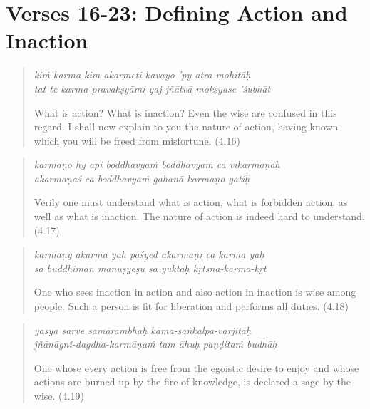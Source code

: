 \documentclass[12pt, twoside, openright]{memoir}
\begin{document}
\section{Verses 16-23: Defining Action and Inaction}\label{sec-verses-16-23-defining-action-and-inaction}

\par
\begin{verse}
\textit{kiṁ karma kim akarmeti kavayo ’py atra mohitāḥ} \\
\textit{tat te karma pravakṣyāmi yaj jñātvā mokṣyase ’śubhāt}

\noindent What is action? What is inaction? Even the wise are confused in this regard. I shall now explain to you the nature of action, having known which you will be freed from misfortune. (4.16)
\end{verse}
\par



\par
\begin{verse}
\textit{karmaṇo hy api boddhavyaṁ boddhavyaṁ ca vikarmaṇaḥ} \\
\textit{akarmaṇaś ca boddhavyaṁ gahanā karmaṇo gatiḥ}

\noindent Verily one must understand what is action, what is forbidden action, as well as what is inaction. The nature of action is indeed hard to understand. (4.17)
\end{verse}
\par



\par
\begin{verse}
\textit{karmaṇy akarma yaḥ paśyed akarmaṇi ca karma yaḥ} \\
\textit{sa buddhimān manuṣyeṣu sa yuktaḥ kṛtsna-karma-kṛt}

\noindent One who sees inaction in action and also action in inaction is wise among people. Such a person is fit for liberation and performs all duties. (4.18)
\end{verse}
\par



\par
\begin{verse}
\textit{yasya sarve samārambhāḥ kāma-saṅkalpa-varjitāḥ} \\
\textit{jñānāgni-dagdha-karmāṇaṁ tam āhuḥ paṇḍitaṁ budhāḥ}

\noindent One whose every action is free from the egoistic desire to enjoy and whose actions are burned up by the fire of knowledge, is declared a sage by the wise. (4.19)
\end{verse}
\par
\end{document}
